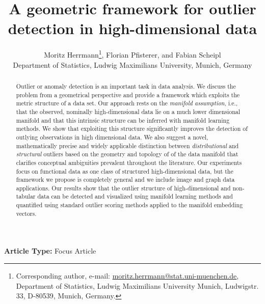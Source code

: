 \title{A geometric framework for outlier detection in high-dimensional data}


\def\correspondingauthor{\footnote{Corresponding author, e-mail: \href{mailto:moritz.herrmann@stat.uni-muenchen.de}{moritz.herrmann@stat.uni-muenchen.de}, Department of Statistics, Ludwig Maximilians University Munich, Ludwigstr. 33, D-80539, Munich, Germany.}}
\author{Moritz Herrmann\correspondingauthor, Florian Pfisterer, and Fabian Scheipl \\
Department of Statistics, Ludwig Maximilians University, Munich, Germany}


\vspace{-1em}
  \date{}
\begingroup
\let\center\flushleft
\let\endcenter\endflushleft
\maketitle
\endgroup
{}

\textbf{Article Type:} Focus Article\\

\begin{abstract}
Outlier or anomaly detection is an important task in data analysis. We discuss the problem from a geometrical perspective and provide a framework which exploits the metric structure of a data set. Our approach rests on the \textit{manifold assumption}, i.e., that the observed, nominally high-dimensional data lie on a much lower dimensional manifold and that this intrinsic structure can be inferred with manifold learning methods. We show that exploiting this structure significantly improves the detection of outlying observations in high dimensional data. We also suggest a novel, mathematically precise and widely applicable distinction between \textit{distributional} and \textit{structural} outliers based on the geometry and topology of of the data manifold that clarifies conceptual ambiguities prevalent throughout the literature.
Our experiments focus on functional data as one class of structured high-dimensional data, but the framework we propose is completely general and we include image and graph data applications. Our results show that the outlier structure of high-dimensional and non-tabular data can be detected and visualized using manifold learning methods and quantified using standard outlier scoring methods applied to the manifold embedding vectors.
\end{abstract}
